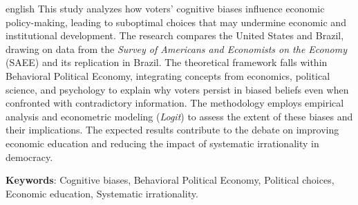
\begin{resumo}[Abstract]
 \begin{otherlanguage*}{english}
  This study analyzes how voters’ cognitive biases influence economic policy-making, leading to suboptimal choices that may undermine economic and institutional development. The research compares the United States and Brazil, drawing on data from the \textit{Survey of Americans and Economists on the Economy} (SAEE) and its replication in Brazil. The theoretical framework falls within Behavioral Political Economy, integrating concepts from economics, political science, and psychology to explain why voters persist in biased beliefs even when confronted with contradictory information. The methodology employs empirical analysis and econometric modeling (\textit{Logit}) to assess the extent of these biases and their implications. The expected results contribute to the debate on improving economic education and reducing the impact of systematic irrationality in democracy.

   \textbf{Keywords}: Cognitive biases, Behavioral Political Economy, Political choices, Economic education, Systematic irrationality.
 \end{otherlanguage*}
\end{resumo}
